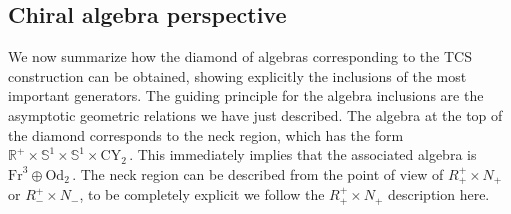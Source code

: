 \documentclass{pspum-l}
\newcommand*\Sc{\mathbb{S}}
\newcommand*\R{\mathbb{R}}
\theoremstyle{definition}
\theoremstyle{remark}
\numberwithin{equation}{section}
\begin{document}
\subsection{Chiral algebra perspective}

\label{sec:TCSalgebra}

We now summarize how the diamond of algebras corresponding to the TCS construction can be obtained, showing explicitly the inclusions of the most important generators. The guiding principle for the algebra inclusions are the asymptotic geometric relations we have just described. The algebra at the top of the diamond corresponds to the neck region, which has the form $\R^+\times\Sc^1\times\Sc^1\times\text{CY}_{2}\,$. This immediately implies that the associated algebra is $\text{Fr}^3\oplus \text{Od}_2\,$. The neck region can be described from the point of view of $R^+_+\times N_+$ or $R^+_-\times N_-$, to be completely explicit we follow the $R^+_+\times N_+$ description here.
\end{document}
